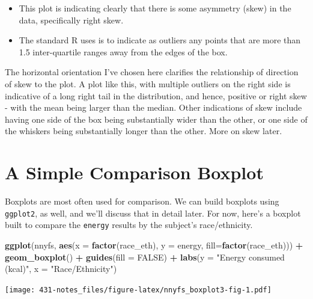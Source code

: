 \documentclass[
]{book}
\newenvironment{Shaded}{\begin{snugshade}}{\end{snugshade}}
\newcommand{\DataTypeTok}[1]{\textcolor[rgb]{0.13,0.29,0.53}{#1}}
\newcommand{\KeywordTok}[1]{\textcolor[rgb]{0.13,0.29,0.53}{\textbf{#1}}}
\newcommand{\NormalTok}[1]{#1}
\newcommand{\OperatorTok}[1]{\textcolor[rgb]{0.81,0.36,0.00}{\textbf{#1}}}
\newcommand{\OtherTok}[1]{\textcolor[rgb]{0.56,0.35,0.01}{#1}}
\newcommand{\StringTok}[1]{\textcolor[rgb]{0.31,0.60,0.02}{#1}}
\providecommand{\tightlist}{%
  \setlength{\itemsep}{0pt}\setlength{\parskip}{0pt}}
\begin{document}
\begin{itemize}
\tightlist
\item
  This plot is indicating clearly that there is some asymmetry (skew) in the data, specifically right skew.
\item
  The standard R uses is to indicate as outliers any points that are more than 1.5 inter-quartile ranges away from the edges of the box.
\end{itemize}

The horizontal orientation I've chosen here clarifies the relationship of direction of skew to the plot. A plot like this, with multiple outliers on the right side is indicative of a long right tail in the distribution, and hence, positive or right skew - with the mean being larger than the median. Other indications of skew include having one side of the box being substantially wider than the other, or one side of the whiskers being substantially longer than the other. More on skew later.

\hypertarget{a-simple-comparison-boxplot}{%
\section{A Simple Comparison Boxplot}\label{a-simple-comparison-boxplot}}

Boxplots are most often used for comparison. We can build boxplots using \texttt{ggplot2}, as well, and we'll discuss that in detail later. For now, here's a boxplot built to compare the \texttt{energy} results by the subject's race/ethnicity.

\begin{Shaded}
\begin{Highlighting}[]
\KeywordTok{ggplot}\NormalTok{(nnyfs, }\KeywordTok{aes}\NormalTok{(}\DataTypeTok{x =} \KeywordTok{factor}\NormalTok{(race_eth), }\DataTypeTok{y =}\NormalTok{ energy, }\DataTypeTok{fill=}\KeywordTok{factor}\NormalTok{(race_eth))) }\OperatorTok{+}
\StringTok{  }\KeywordTok{geom_boxplot}\NormalTok{() }\OperatorTok{+}\StringTok{ }
\StringTok{  }\KeywordTok{guides}\NormalTok{(}\DataTypeTok{fill =} \OtherTok{FALSE}\NormalTok{) }\OperatorTok{+}
\StringTok{  }\KeywordTok{labs}\NormalTok{(}\DataTypeTok{y =} \StringTok{"Energy consumed (kcal)"}\NormalTok{, }\DataTypeTok{x =} \StringTok{"Race/Ethnicity"}\NormalTok{)}
\end{Highlighting}
\end{Shaded}

\texttt{[image: 431-notes\_files/figure-latex/nnyfs\_boxplot3-fig-1.pdf]}
\end{document}
